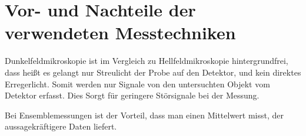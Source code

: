 
\section{Vor- und Nachteile der verwendeten Messtechniken}

Dunkelfeldmikroskopie ist im Vergleich zu Hellfeldmikroskopie hintergrundfrei, dass heißt es gelangt nur Streulicht der Probe auf den Detektor, und kein direktes Erregerlicht. Somit werden nur Signale von den untersuchten Objekt vom Detektor erfasst. Dies Sorgt für geringere Störsignale bei der Messung.

Bei Ensemblemessungen ist der Vorteil, dass man einen Mittelwert misst, der aussagekräftigere Daten liefert.